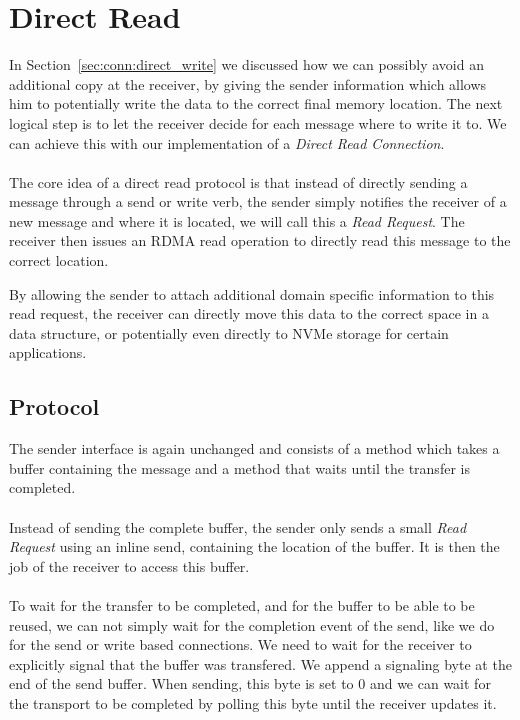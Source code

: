 
\section{Direct Read} \label{sec:conn:direct_read}

In Section~\ref{sec:conn:direct_write} we discussed how we can possibly avoid an additional copy at the receiver, by giving 
the sender information which allows him to potentially write the data to the correct final memory location. The next logical
step is to let the receiver decide for each message where to write it to. We can achieve this with our implementation of a
\emph{Direct Read Connection}.

\paragraph{} The core idea of a direct read protocol is that instead of directly sending a message through a send or write 
verb, the sender simply notifies the receiver of a new message and where it is located, we will call this a \emph{Read Request}.
The receiver then issues an RDMA read operation to directly read this message to the correct location.

By allowing the sender to attach additional domain specific information to this read request, the receiver can directly 
move this data to the correct space in a data structure, or potentially even directly to NVMe storage for certain applications.


\subsection{Protocol}
The sender interface is again unchanged and consists of a  method which takes a buffer containing the
message and a  method that waits until the transfer is completed.

\paragraph{} Instead of sending the complete buffer, the sender only sends a small \emph{Read Request} using an inline send,
containing the location of the buffer. It is then the job of the receiver to access this buffer.

\paragraph{} To wait for the transfer to be completed, and for the buffer to be able to be reused, we can not simply wait 
for the completion event of the send, like we do for the send or write based connections. We need to wait for the receiver 
to explicitly signal that the buffer was transfered. We append a signaling byte at the end of the send buffer. 
When sending, this byte  is set to 0 and we can wait for the transport to be completed by polling this byte until the 
receiver updates it.

